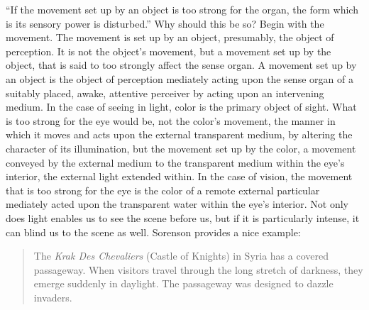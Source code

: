``If the movement set up by an object is too strong for the organ, the form which is its sensory power is disturbed.'' Why should this be so? Begin with the movement. The movement is set up by an object, presumably, the object of perception. It is not the object's movement, but a movement set up by the object, that is said to too strongly affect the sense organ. A movement set up by an object is the object of perception mediately acting upon the sense organ of a suitably placed, awake, attentive perceiver by acting upon an intervening medium. In the case of seeing in light, color is the primary object of sight. What is too strong for the eye would be, not the color's movement, the manner in which it moves and acts upon the external transparent medium, by altering the character of its illumination, but the movement set up by the color, a movement conveyed by the external medium to the transparent medium within the eye's interior, the external light extended within. In the case of vision, the movement that is too strong for the eye is the color of a remote external particular mediately acted upon the transparent water within the eye's interior. Not only does light enables us to see the scene before us, but if it is particularly intense, it can blind us to the scene as well. Sorenson provides a nice example:
\begin{quote}
	The \emph{Krak Des Chevaliers} (Castle of Knights) in Syria has a covered passageway. When visitors travel through the long stretch of darkness, they emerge suddenly in daylight. The passageway was designed to dazzle invaders. \citep[6]{Sorensen:2008kx}
\end{quote}

